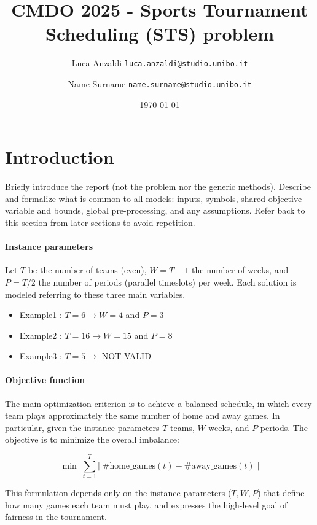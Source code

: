 \documentclass{article}
\title{CMDO 2025 - Sports Tournament Scheduling
(STS) problem}
\author{%
Luca Anzaldi \texttt{luca.anzaldi@studio.unibo.it} \and
Name Surname \texttt{name.surname@studio.unibo.it}
}
\date{\today}
\begin{document}
\maketitle

\section{Introduction}
Briefly introduce the report (not the problem nor the generic methods).
Describe and formalize what is common to all models:
inputs, symbols, shared objective variable and bounds, global pre-processing,
and any assumptions.
Refer back to this section from later sections to avoid repetition.

\paragraph{Instance parameters}
Let \(T\) be the number of teams (even), \(W=T-1\) the number of weeks, and \(P=T/2\) the number of periods (parallel timeslots) per week.
Each solution is modeled referring to these three main variables.

\begin{itemize}
    \item Example1 : $ T = 6 \xrightarrow{} W = 4 $ and  $ P = 3 $
    \item Example2 : $ T = 16 \xrightarrow{} W = 15 $ and  $ P = 8 $
    \item Example3 : $ T = 5  \xrightarrow{} $ NOT VALID 
\end{itemize}

\paragraph{Objective function}

The main optimization criterion is to achieve a balanced schedule,
in which every team plays approximately the same number of home and away
games. In particular, given the instance parameters 
$T$ teams, $W$ weeks, and $P$ periods.
The objective is to minimize the overall imbalance:

\[
\min \; \sum_{t=1}^{T} \Big| \; 
\#\text{home\_games}(t) - \#\text{away\_games}(t) \; \Big|
\]

This formulation depends only on the instance parameters
($T, W, P$) that define how many games each team must play,
and expresses the high-level goal of fairness in the tournament.
\end{document}
